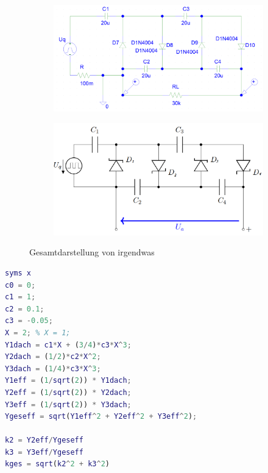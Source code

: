 \documentclass[
12pt,
a4paper,
bibliography=totoc,
listof=totoc,
headings=small,
parskip=half*, %
]{scrartcl}
\begin{document}
\begin{figure}[H]
    \centering
    \begin{subfigure}[b]{0.45\textwidth} %
        \includegraphics[width=\textwidth]{psch_kaskade}
        \label{psch_kaskade}
    \end{subfigure}
    \hfill %
    \begin{subfigure}[b]{0.45\textwidth}
    	\includegraphics[width=\textwidth]{schaltung}
        \label{kaskadenschaltung_2}
    \end{subfigure}
    \caption{Gesamtdarstellung von irgendwas}
\end{figure}

\begin{lstlisting}[language=matlab]
syms x
c0 = 0;
c1 = 1;
c2 = 0.1;
c3 = -0.05;
X = 2; % X = 1;
Y1dach = c1*X + (3/4)*c3*X^3;
Y2dach = (1/2)*c2*X^2;
Y3dach = (1/4)*c3*X^3;
Y1eff = (1/sqrt(2)) * Y1dach;
Y2eff = (1/sqrt(2)) * Y2dach;
Y3eff = (1/sqrt(2)) * Y3dach;
Ygeseff = sqrt(Y1eff^2 + Y2eff^2 + Y3eff^2);

k2 = Y2eff/Ygeseff
k3 = Y3eff/Ygeseff
kges = sqrt(k2^2 + k3^2)

\end{lstlisting}
\end{document}
